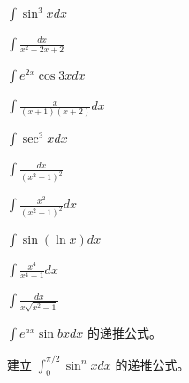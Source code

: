 \begin{exercise}[4] \(\int \sin^3 x dx\)\end{exercise}
\begin{exercise}[4] \(\int \frac{dx}{x^2+2x+2}\)\end{exercise}
\begin{exercise}[4] \(\int e^{2x}\cos 3x dx\)\end{exercise}
\begin{exercise}[4] \(\int \frac{x}{(x+1)(x+2)} dx\)\end{exercise}
\begin{exercise}[5] \(\int \sec^3 x dx\)\end{exercise}
\begin{exercise}[5] \(\int \frac{dx}{(x^2+1)^2}\)\end{exercise}
\begin{exercise}[5] \(\int \frac{x^2}{(x^2+1)^2} dx\)\end{exercise}
\begin{exercise}[5] \(\int \sin(\ln x) dx\)\end{exercise}
\begin{exercise}[6] \(\int \frac{x^4}{x^4-1} dx\)\end{exercise}
\begin{exercise}[6] \(\int \frac{dx}{x\sqrt{x^2-1}}\)\end{exercise}
\begin{exercise}[6] \(\int e^{ax}\sin bx dx\) 的递推公式。\end{exercise}
\begin{exercise}[7] 建立 \(\int_0^{\pi/2} \sin^n x dx\) 的递推公式。\end{exercise}
